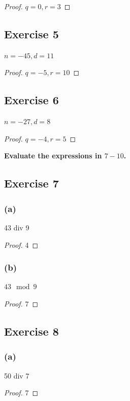 \documentclass[14pt]{extarticle}
\newcommand{\cy}{\color{cyan}}
\begin{document}
\begin{proof}
$q = 0, r = 3$
\end{proof}

\subsection{Exercise 5}
$n = -45, d = 11$

\begin{proof}
$q = -5, r = 10$
\end{proof}

\subsection{Exercise 6}
$n = -27, d = 8$

\begin{proof}
$q = -4, r = 5$
\end{proof}

{\bf \cy Evaluate the expressions in $7-10$.}

\subsection{Exercise 7}

\subsubsection{(a)}
43 div 9

\begin{proof}
4
\end{proof}

\subsubsection{(b)}
$43 \mod 9$

\begin{proof}
7
\end{proof}

\subsection{Exercise 8}

\subsubsection{(a)}
50 div 7

\begin{proof}
7
\end{proof}
\end{document}
